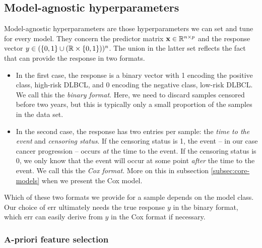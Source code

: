 \subsection{Model-agnostic hyperparameters}\label{subsec:model-agnostic}

Model-agnostic hyperparameters are those hyperparameters we can set and tune for every model. They 
concern the predictor matrix $\mathbf{x} \in \mathbb{R}^{n \times p}$ and the response vector $y \in 
(\{0, 1\} \cup (\mathbb{R} \times \{ 0, 1 \}))^n$. The union in the latter set reflects the fact that 
can provide the response in two formats. 
\begin{itemize}
    \item In the first case, the response is a binary vector with 1 encoding the positive class, 
        high-risk DLBCL, and 0 encoding the negative class, low-risk DLBCL. We call this the 
        \textit{binary format}. Here, we need to discard samples censored before two years, but this 
        is typically only a small proportion of the samples in the data set. 
    \item In the second case, the response has two entries per sample: the \textit{time to the 
        event} and \textit{censoring status}. If the censoring status is 1, the event -- in our case 
        cancer progression -- occurs \textit{at} the time to the event. If the censoring status is 
        0, 
        we only know that the event will occur at some point \textit{after} the time to the event.
        We call this the \textit{Cox format}. More on this in subsection \ref{subsec:core-models} 
        when we present the Cox model. 
\end{itemize}

Which of these two formats we provide for a sample 
depends on the model class. Our choice of $\text{err}$ ultimately needs the true response $y$ in 
the binary format, which $\text{err}$ can easily derive from $y$ in the Cox format if necessary.

\subsubsection{A-priori feature selection}


